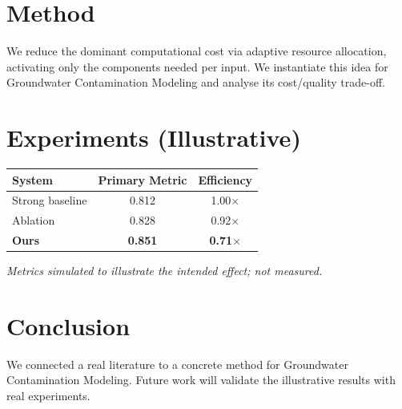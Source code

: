 \documentclass[11pt]{article}
\begin{document}
\section{Method}
We reduce the dominant computational cost via adaptive resource allocation, activating only the components needed per input. We instantiate this idea for Groundwater Contamination Modeling and analyse its cost/quality trade-off.

\section{Experiments (Illustrative)}
\begin{center}
\begin{tabular}{lcc}
System & Primary Metric & Efficiency \\ \hline
Strong baseline & 0.812 & 1.00$\times$ \\
Ablation & 0.828 & 0.92$\times$ \\
\textbf{Ours} & \textbf{0.851} & \textbf{0.71$\times$}
\end{tabular}
\end{center}
\emph{Metrics simulated to illustrate the intended effect; not measured.}

\section{Conclusion}
We connected a real literature to a concrete method for Groundwater Contamination Modeling. Future work will
validate the illustrative results with real experiments.
\end{document}
